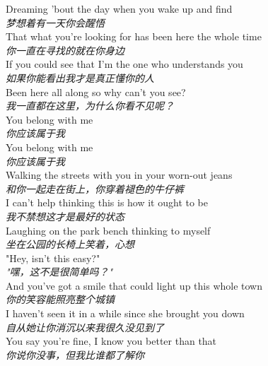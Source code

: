 \begin{spacing}{1.5}
\begin{flushleft}
Dreaming 'bout the day when you wake up and find\\
\textit{梦想着有一天你会醒悟}\\[0.5em]

That what you're looking for has been here the whole time\\
\textit{你一直在寻找的就在你身边}\\[0.5em]

If you could see that I'm the one who understands you\\
\textit{如果你能看出我才是真正懂你的人}\\[0.5em]

Been here all along so why can't you see?\\
\textit{我一直都在这里，为什么你看不见呢？}\\[0.5em]

You belong with me\\
\textit{你应该属于我}\\[0.5em]

You belong with me\\
\textit{你应该属于我}\\[0.5em]

Walking the streets with you in your worn-out jeans\\
\textit{和你一起走在街上，你穿着褪色的牛仔裤}\\[0.5em]

I can't help thinking this is how it ought to be\\
\textit{我不禁想这才是最好的状态}\\[0.5em]

Laughing on the park bench thinking to myself\\
\textit{坐在公园的长椅上笑着，心想}\\[0.5em]

"Hey, isn't this easy?"\\
\textit{"嘿，这不是很简单吗？"}\\[0.5em]

And you've got a smile that could light up this whole town\\
\textit{你的笑容能照亮整个城镇}\\[0.5em]

I haven't seen it in a while since she brought you down\\
\textit{自从她让你消沉以来我很久没见到了}\\[0.5em]

You say you're fine, I know you better than that\\
\textit{你说你没事，但我比谁都了解你}\\[0.5em]


\end{flushleft}
\end{spacing}
